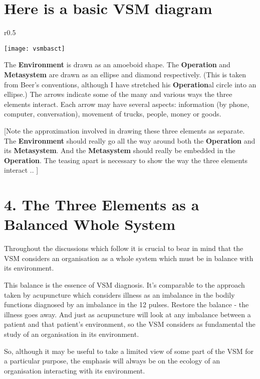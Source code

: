 \section*{Here is a basic VSM diagram}
\begin{wrapfigure}{r}{0.5\textwidth}
\begin{center}
    \texttt{[image: vsmbasct]}
\end{center}
\end{wrapfigure}

The \textcolor{E}{\textbf{Environment}} is drawn as an amoeboid shape. The \textcolor{O}{\textbf{Operation}} and \textcolor{M}{\textbf{Metasystem}} are drawn as an ellipse and diamond respectively. (This is taken from Beer's conventions, although I have stretched his \textcolor{O}{\textbf{Operation}}al circle into an ellipse.) The arrows indicate some of the many and various ways the three elements interact. Each arrow may have several aspects: information (by phone, computer, conversation), movement of trucks, people, money or goods.

{[}Note the approximation involved in drawing these three elements as separate. The \textcolor{E}{\textbf{Environment}} should really go all the way around both the \textcolor{O}{\textbf{Operation}} and its \textcolor{M}{\textbf{Metasystem}}. And the \textcolor{M}{\textbf{Metasystem}} should really be embedded in the \textcolor{O}{\textbf{Operation}}. The teasing apart is necessary to show the way the three elements interact .. {]}

\section*{4. The Three Elements as a Balanced Whole System}
Throughout the discussions which follow it is crucial to bear in mind that the VSM considers an organisation as a whole system which must be in balance with its environment.

This balance is the essence of VSM diagnosis. It's comparable to the approach taken by acupuncture which considers illness as an imbalance in the bodily functions diagnosed by an imbalance in the 12 pulses. Restore the balance - the illness goes away. And just as acupuncture will look at any imbalance between a patient and that patient's environment, so the VSM considers as fundamental the study of an organisation in its environment.

So, although it may be useful to take a limited view of some part of the VSM for a particular purpose, the emphasis will always be on the ecology of an organisation interacting with its environment.


